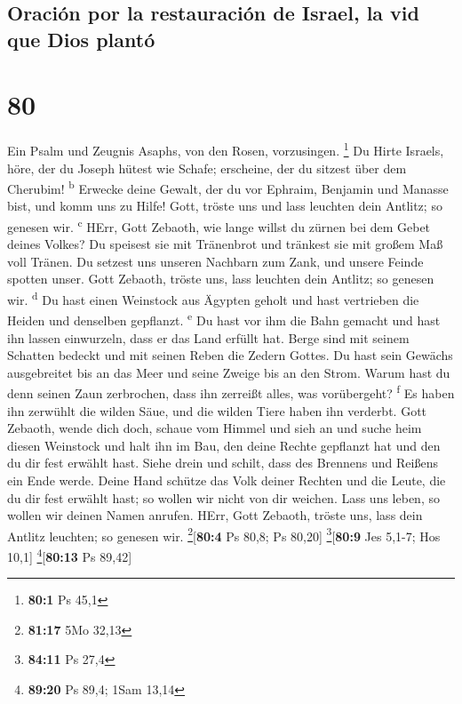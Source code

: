 \hypertarget{oraciuxf3n-por-la-restauraciuxf3n-de-israel-la-vid-que-dios-plantuxf3}{%
\subsection{Oración por la restauración de Israel, la vid que Dios
plantó}\label{oraciuxf3n-por-la-restauraciuxf3n-de-israel-la-vid-que-dios-plantuxf3}}

\hypertarget{section-79}{%
\section{80}\label{section-79}}

 Ein Psalm und Zeugnis Asaphs, von den Rosen, vorzusingen.
\footnote{\textbf{80:1} Ps 45,1}  Du Hirte Israels, höre,
der du Joseph hütest wie Schafe; erscheine, der du sitzest über dem
Cherubim! \textsuperscript{b}  Erwecke deine Gewalt, der
du vor Ephraim, Benjamin und Manasse bist, und komm uns zu Hilfe!
 Gott, tröste uns und lass leuchten dein Antlitz; so
genesen wir. \textsuperscript{c}  HErr, Gott Zebaoth, wie
lange willst du zürnen bei dem Gebet deines Volkes?  Du
speisest sie mit Tränenbrot und tränkest sie mit großem Maß voll Tränen.
 Du setzest uns unseren Nachbarn zum Zank, und unsere
Feinde spotten unser.  Gott Zebaoth, tröste uns, lass
leuchten dein Antlitz; so genesen wir. \textsuperscript{d}
 Du hast einen Weinstock aus Ägypten geholt und hast
vertrieben die Heiden und denselben gepflanzt. \textsuperscript{e}
 Du hast vor ihm die Bahn gemacht und hast ihn lassen
einwurzeln, dass er das Land erfüllt hat.  Berge sind mit
seinem Schatten bedeckt und mit seinen Reben die Zedern Gottes.
 Du hast sein Gewächs ausgebreitet bis an das Meer und
seine Zweige bis an den Strom.  Warum hast du denn seinen
Zaun zerbrochen, dass ihn zerreißt alles, was vorübergeht?
\textsuperscript{f}  Es haben ihn zerwühlt die wilden
Säue, und die wilden Tiere haben ihn verderbt.  Gott
Zebaoth, wende dich doch, schaue vom Himmel und sieh an und suche heim
diesen Weinstock  und halt ihn im Bau, den deine Rechte
gepflanzt hat und den du dir fest erwählt hast.  Siehe
drein und schilt, dass des Brennens und Reißens ein Ende werde.
 Deine Hand schütze das Volk deiner Rechten und die
Leute, die du dir fest erwählt hast;  so wollen wir nicht
von dir weichen. Lass uns leben, so wollen wir deinen Namen anrufen.
 HErr, Gott Zebaoth, tröste uns, lass dein Antlitz
leuchten; so genesen wir. \footnote{\textbf{81:17} 5Mo 32,13}{[}\textbf{80:4}
Ps 80,8; Ps 80,20{]} \footnote{\textbf{84:11} Ps 27,4}{[}\textbf{80:9}
Jes 5,1-7; Hos 10,1{]} \footnote{\textbf{89:20} Ps 89,4; 1Sam 13,14}{[}\textbf{80:13}
Ps 89,42{]}

